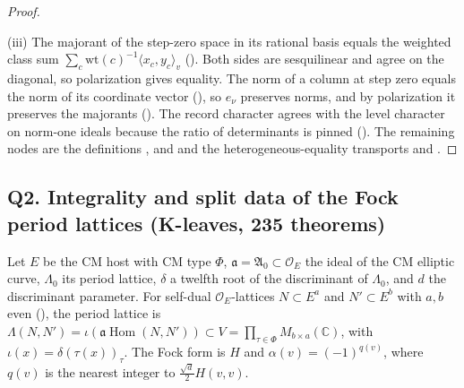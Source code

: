 \documentclass[11pt]{article}
\newcommand{\OEr}{\mathcal O_E}
\newcommand{\Hom}{\operatorname{Hom}}
\theoremstyle{remark}
\begin{document}
\begin{proof}
\begin{itemize}[leftmargin=*,itemsep=1pt]
\end{itemize}
(iii) The majorant of the step-zero space in its rational basis equals the weighted class sum $\sum_c\mathrm{wt}(c)^{-1}\langle x_c,y_c\rangle_v$ (). Both sides are sesquilinear and agree on the diagonal, so polarization gives equality. The norm of a column at step zero equals the norm of its coordinate vector (), so $e_\nu$ preserves norms, and by polarization it preserves the majorants (). The record character agrees with the level character on norm-one ideals because the ratio of determinants is pinned (). The remaining nodes are the definitions ,  and  and the heterogeneous-equality transports  and .
\end{proof}

\subsection{Q2. Integrality and split data of the Fock period lattices (K-leaves, 235 theorems)}

Let $E$ be the CM host with CM type $\Phi$, $\mathfrak a=\mathfrak A_0\subset\OEr$ the ideal of the CM elliptic curve, $\Lambda_0$ its period lattice, $\delta$ a twelfth root of the discriminant of $\Lambda_0$, and $d$ the discriminant parameter. For self-dual $\OEr$-lattices $N\subset E^a$ and $N'\subset E^b$ with $a,b$ even (), the period lattice is $\Lambda(N,N')=\iota(\mathfrak a\Hom(N,N'))\subset V=\prod_{\tau\in\Phi}M_{b\times a}(\mathbb C)$, with $\iota(x)=\delta(\tau(x))_\tau$. The Fock form is $H$ and $\alpha(v)=(-1)^{q(v)}$, where $q(v)$ is the nearest integer to $\frac{\sqrt d}2H(v,v)$.
\end{document}

